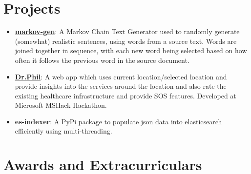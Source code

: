 \documentclass[11pt,a4paper,sans]{moderncv} %
\begin{document}
\setlength{\hintscolumnwidth}{2cm} %


\section{Projects}
\begin{itemize}
    \item \textbf{\href{https://github.com/itsron717/markov-gen}{markov-gen}}: A Markov Chain Text Generator used to randomly generate (somewhat) realistic sentences, using words from a source text. Words are joined together in sequence, with each new word being selected based on how often it follows the previous word in the source document.
    \item \textbf{\href{https://devpost.com/software/dr-phil-t25iap}{Dr.Phil}}: A web app which uses current location/selected location and provide insights into the services around the location and also rate the existing healthcare infrastructure and provide SOS features. Developed at Microsoft MSHack Hackathon.
    \item \textbf{\href{https://github.com/itsron717/es-indexer}{es-indexer}}: A \href{https://pypi.org/project/es-indexer/0.1/}{PyPi package} to populate json data into elasticsearch efficiently using multi-threading. 
\end{itemize}







\section{Awards and Extracurriculars}

\end{document}
